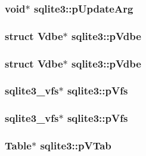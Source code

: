 \subsubsection{\setlength{\rightskip}{0pt plus 5cm}void$\ast$ \bf{sqlite3::p\-Update\-Arg}}\label{structsqlite3_c48b0501148e61e621042ab00466f288}


\subsubsection{\setlength{\rightskip}{0pt plus 5cm}struct \bf{Vdbe}$\ast$ \bf{sqlite3::p\-Vdbe}}\label{structsqlite3_eaca71783d03a2a7c54a1d5364f696cc}


\subsubsection{\setlength{\rightskip}{0pt plus 5cm}struct \bf{Vdbe}$\ast$ \bf{sqlite3::p\-Vdbe}}\label{structsqlite3_eaca71783d03a2a7c54a1d5364f696cc}


\subsubsection{\setlength{\rightskip}{0pt plus 5cm}\bf{sqlite3\_\-vfs}$\ast$ \bf{sqlite3::p\-Vfs}}\label{structsqlite3_36a7d0dd9ebab4d4f119b7bd63763876}


\subsubsection{\setlength{\rightskip}{0pt plus 5cm}\bf{sqlite3\_\-vfs}$\ast$ \bf{sqlite3::p\-Vfs}}\label{structsqlite3_36a7d0dd9ebab4d4f119b7bd63763876}


\subsubsection{\setlength{\rightskip}{0pt plus 5cm}\bf{Table}$\ast$ \bf{sqlite3::p\-VTab}}\label{structsqlite3_b483451c642bd64eddd4af3863aba9b4}


